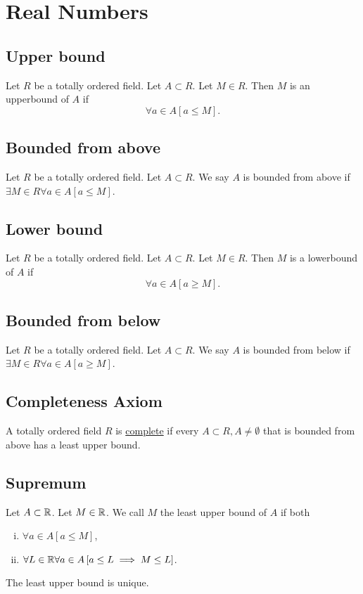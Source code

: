 \section{Real Numbers}


\subsection{Upper bound}
\udef Let $R$ be a totally ordered field. Let $A \subset R$. Let $M \in R$.
Then $M$ is an upperbound of $A$ if
\begin{equation*}
    \forall a \in A \left[ a \leq M \right].
\end{equation*}


\subsection{Bounded from above}
\udef Let $R$ be a totally ordered field. Let $A \subset R$. We say $A$ is
bounded from above if $\exists M \in R \forall a \in A \left[ a \leq M \right]$.


\subsection{Lower bound}
\udef Let $R$ be a totally ordered field. Let $A \subset R$. Let $M \in R$.
Then $M$ is a lowerbound of $A$ if
\begin{equation*}
    \forall a \in A \left[ a \geq M \right].
\end{equation*}


\subsection{Bounded from below}
\udef Let $R$ be a totally ordered field. Let $A \subset R$. We say $A$ is
bounded from below if $\exists M \in R \forall a \in A \left[ a \geq M \right]$.


\subsection{Completeness Axiom}
A totally ordered field $R$ is \ul{complete} if every
$A \subset R, A \neq \emptyset$ that is bounded from above has a least upper bound.


\subsection{Supremum}
Let $A \subset \mathbb{R}$. Let $M \in \mathbb{R}$. We call $M$ the least upper bound of $A$ if both
\begin{enumerate}[(i)]
    \item $\forall a \in A \left[ a \leq M \right]$,
    \item $\forall L \in \mathbb{R} \forall a \in A \left[ a \leq L \implies M \leq L \right]$.
\end{enumerate}
The least upper bound is unique.

